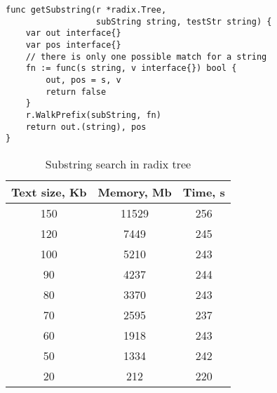 \newpage
\begin{lstlisting}[caption=Radix tree lookup]
func getSubstring(r *radix.Tree,
                  subString string, testStr string) {
	var out interface{}
	var pos interface{}
	// there is only one possible match for a string
	fn := func(s string, v interface{}) bool {
		out, pos = s, v
		return false
	}
	r.WalkPrefix(subString, fn)
	return out.(string), pos
}
\end{lstlisting}


\begin{table}[ht!]
    \centering
    \begin{tabular}{|c|c|c|}
        \hline
        Text size, Kb & Memory, Mb & Time, s\\
        \hline
        150 & 11529 & 256\\
        \hline
        120 & 7449 & 245\\
        \hline
        100 & 5210 & 243\\
        \hline
        90 & 4237 & 244\\
        \hline
        80 & 3370 & 243\\
        \hline
        70 & 2595 & 237\\
        \hline
        60 & 1918 & 243\\
        \hline
        50 & 1334 & 242\\
        \hline
        20 & 212 & 220\\
        \hline
    \end{tabular}
    \caption{Substring search in radix tree}
    \label{table:5}
\end{table}

